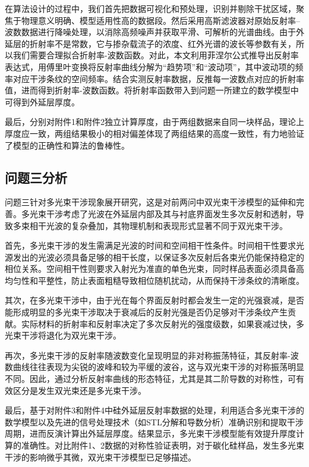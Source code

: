 \documentclass[withoutpreface,bwprint]{cumcmthesis}
\begin{document}
在算法设计的过程中，我们首先把数据可视化和预处理，识别并剔除干扰区域，聚焦于物理意义明确、模型适用性高的数据段。然后采用高斯滤波器对原始反射率–波数数据进行降噪处理，以消除高频噪声并获取平滑、可解析的光谱曲线。由于外延层的折射率不是常数，它与掺杂载流子的浓度、红外光谱的波长等参数有关，所以我们需要合理拟合折射率-波数函数。对此，本文利用菲涅尔公式推导出反射率表达式，用傅里叶变换将反射率曲线分解为“趋势项”和“波动项”，其中波动项的频率对应干涉条纹的空间频率。结合实测反射率数据，反推每一波数点对应的折射率值，进而得到折射率-波数函数。将折射率函数带入到问题一所建立的数学模型中可得到外延层厚度。

最后，分别对附件1和附件2独立计算厚度，由于两组数据来自同一块样品，理论上厚度应一致，两组结果极小的相对偏差体现了两组结果的高度一致性，有力地验证了模型的正确性和算法的鲁棒性。
  


\subsection{问题三分析}
问题三针对多光束干涉现象展开研究，这是对前两问中双光束干涉模型的延伸和完善。多光束干涉考虑了光波在外延层内部及其与衬底界面发生多次反射和透射，导致多束相干光波的复杂叠加，其物理机制和表现形式显著不同于双光束干涉。

首先，多光束干涉的发生需满足光波的时间和空间相干性条件。时间相干性要求光源发出的光波必须具备足够的相干长度，以保证多次反射后各束光仍能保持稳定的相位关系。空间相干性则要求入射光为准直的单色光束，同时样品表面必须具备高均匀性和平整性，防止表面粗糙导致相位随机扰动，从而保持干涉条纹的清晰度。

其次，在多光束干涉中，由于光在每个界面反射时都会发生一定的光强衰减，是否能形成明显的多光束干涉取决于衰减后的反射光强是否仍足够对干涉条纹产生贡献。实际材料的折射率和反射率决定了多次反射光的强度级数，如果衰减过快，多光束干涉将退化为双光束干涉。

再次，多光束干涉的反射率随波数变化呈现明显的非对称振荡特征，其反射率-波数曲线往往表现为尖锐的波峰和较为平缓的波谷，这与双光束干涉的对称振荡明显不同。因此，通过分析反射率曲线的形态特征，尤其是其二阶导数的对称性，可有效区分是发生双光束还是多光束干涉。

最后，基于对附件3和附件4中硅外延层反射率数据的处理，利用适合多光束干涉的数学模型以及先进的信号处理技术（如STL分解和导数分析）准确识别和提取干涉周期，进而反演计算出外延层厚度。结果显示，多光束干涉模型能有效提升厚度计算的准确性。对比附件1、2数据的对称性验证表明，对于碳化硅样品，发生多光束干涉的影响微乎其微，双光束干涉模型已足够描述。
\end{document}
